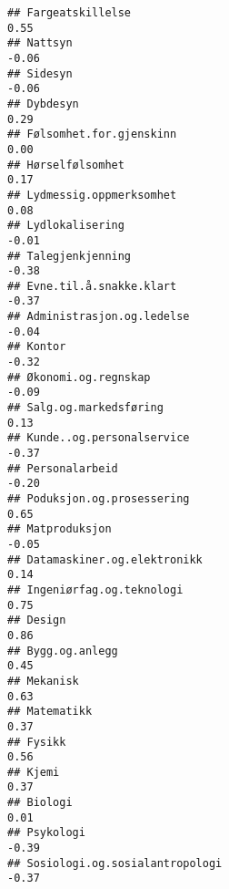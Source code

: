 \documentclass[
]{article}
\begin{document}
\begin{verbatim}
## Fargeatskillelse                                                                  0.55
## Nattsyn                                                                          -0.06
## Sidesyn                                                                          -0.06
## Dybdesyn                                                                          0.29
## Følsomhet.for.gjenskinn                                                           0.00
## Hørselfølsomhet                                                                   0.17
## Lydmessig.oppmerksomhet                                                           0.08
## Lydlokalisering                                                                  -0.01
## Talegjenkjenning                                                                 -0.38
## Evne.til.å.snakke.klart                                                          -0.37
## Administrasjon.og.ledelse                                                        -0.04
## Kontor                                                                           -0.32
## Økonomi.og.regnskap                                                              -0.09
## Salg.og.markedsføring                                                             0.13
## Kunde..og.personalservice                                                        -0.37
## Personalarbeid                                                                   -0.20
## Poduksjon.og.prosessering                                                         0.65
## Matproduksjon                                                                    -0.05
## Datamaskiner.og.elektronikk                                                       0.14
## Ingeniørfag.og.teknologi                                                          0.75
## Design                                                                            0.86
## Bygg.og.anlegg                                                                    0.45
## Mekanisk                                                                          0.63
## Matematikk                                                                        0.37
## Fysikk                                                                            0.56
## Kjemi                                                                             0.37
## Biologi                                                                           0.01
## Psykologi                                                                        -0.39
## Sosiologi.og.sosialantropologi                                                   -0.37

\end{verbatim}
\end{document}
